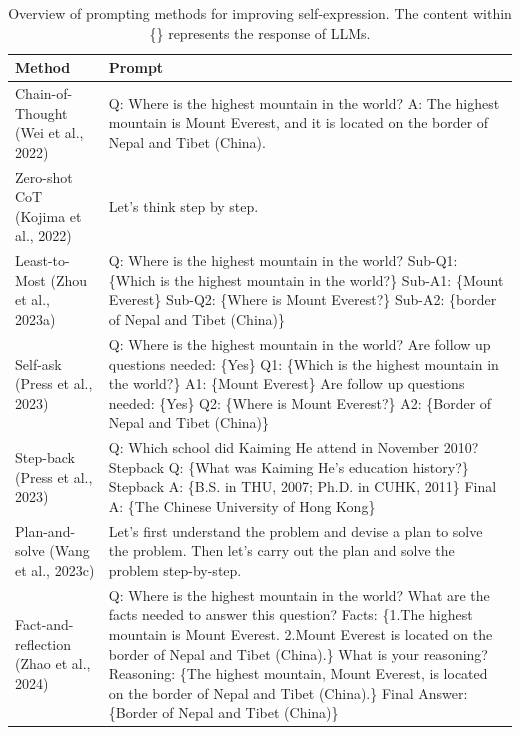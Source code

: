 \begin{table}[t]
\centering
\caption{Overview of prompting methods for improving self-expression. The content within \{\} represents the response of LLMs.}
\label{tab:prompt_se}
\small
\begin{tabular}{p{3.2cm} p{9.5cm}}
\toprule
\textbf{Method} & \textbf{Prompt} \\
\midrule
Chain-of-Thought (Wei et al., 2022) & Q: Where is the highest mountain in the world? A: The highest mountain is Mount Everest, and it is located on the border of Nepal and Tibet (China). \\
\addlinespace
Zero-shot CoT (Kojima et al., 2022) & Let's think step by step. \\
\addlinespace
Least-to-Most (Zhou et al., 2023a) & Q: Where is the highest mountain in the world? Sub-Q1: \{Which is the highest mountain in the world?\} Sub-A1: \{Mount Everest\} Sub-Q2: \{Where is Mount Everest?\} Sub-A2: \{border of Nepal and Tibet (China)\} \\
\addlinespace
Self-ask (Press et al., 2023) & Q: Where is the highest mountain in the world? Are follow up questions needed: \{Yes\} Q1: \{Which is the highest mountain in the world?\} A1: \{Mount Everest\} Are follow up questions needed: \{Yes\} Q2: \{Where is Mount Everest?\} A2: \{Border of Nepal and Tibet (China)\} \\
\addlinespace
Step-back (Press et al., 2023) & Q: Which school did Kaiming He attend in November 2010? Stepback Q: \{What was Kaiming He's education history?\} Stepback A: \{B.S. in THU, 2007; Ph.D. in CUHK, 2011\} Final A: \{The Chinese University of Hong Kong\} \\
\addlinespace
Plan-and-solve (Wang et al., 2023c) & Let's first understand the problem and devise a plan to solve the problem. Then let's carry out the plan and solve the problem step-by-step. \\
\addlinespace
Fact-and-reflection (Zhao et al., 2024) & Q: Where is the highest mountain in the world? What are the facts needed to answer this question? Facts: \{1.The highest mountain is Mount Everest. 2.Mount Everest is located on the border of Nepal and Tibet (China).\} What is your reasoning? Reasoning: \{The highest mountain, Mount Everest, is located on the border of Nepal and Tibet (China).\} Final Answer: \{Border of Nepal and Tibet (China)\} \\
\bottomrule
\end{tabular}
\end{table}

